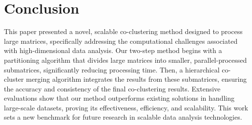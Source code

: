 
\section{Conclusion}
\label{sec:conclude}
This paper presented a novel, scalable co-clustering method designed to process large matrices, specifically addressing the computational challenges associated with high-dimensional data analysis. Our two-step method begins with a partitioning algorithm that divides large matrices into smaller, parallel-processed submatrices, significantly reducing processing time. Then, a hierarchical co-cluster merging algorithm integrates the results from these submatrices, ensuring the accuracy and consistency of the final co-clustering results. Extensive evaluations show that our method outperforms existing solutions in handling large-scale datasets, proving its effectiveness, efficiency, and scalability. This work sets a new benchmark for future research in scalable data analysis technologies.
